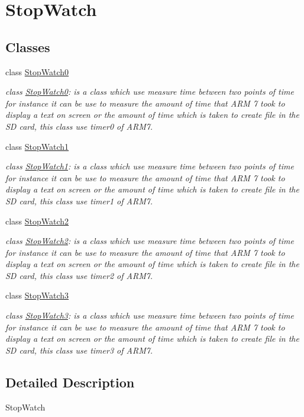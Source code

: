 \hypertarget{group__group2}{
\section{StopWatch}
\label{d7/dac/group__group2}
}
\subsection*{Classes}
\begin{DoxyCompactItemize}
\item 
class \hyperlink{class_stop_watch0}{StopWatch0}
\begin{DoxyCompactList}\small\item\em class \hyperlink{class_stop_watch0}{StopWatch0}: is a class which use measure time between two points of time for instance it can be use to measure the amount of time that ARM 7 took to display a text on screen or the amount of time which is taken to create file in the SD card, this class use timer0 of ARM7. \end{DoxyCompactList}\item 
class \hyperlink{class_stop_watch1}{StopWatch1}
\begin{DoxyCompactList}\small\item\em class \hyperlink{class_stop_watch1}{StopWatch1}: is a class which use measure time between two points of time for instance it can be use to measure the amount of time that ARM 7 took to display a text on screen or the amount of time which is taken to create file in the SD card, this class use timer1 of ARM7. \end{DoxyCompactList}\item 
class \hyperlink{class_stop_watch2}{StopWatch2}
\begin{DoxyCompactList}\small\item\em class \hyperlink{class_stop_watch2}{StopWatch2}: is a class which use measure time between two points of time for instance it can be use to measure the amount of time that ARM 7 took to display a text on screen or the amount of time which is taken to create file in the SD card, this class use timer2 of ARM7. \end{DoxyCompactList}\item 
class \hyperlink{class_stop_watch3}{StopWatch3}
\begin{DoxyCompactList}\small\item\em class \hyperlink{class_stop_watch3}{StopWatch3}: is a class which use measure time between two points of time for instance it can be use to measure the amount of time that ARM 7 took to display a text on screen or the amount of time which is taken to create file in the SD card, this class use timer3 of ARM7. \end{DoxyCompactList}\end{DoxyCompactItemize}


\subsection{Detailed Description}
StopWatch 